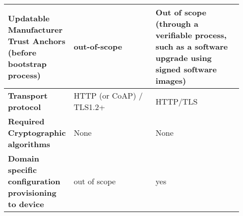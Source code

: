 \begin{longtable}{|m{0.171\linewidth}|m{0.372\linewidth}|m{0.393\linewidth}|}
		\hline
		\rowcolor[rgb]{ .745,  .804,  .843} \textbf{Updatable Manufacturer Trust Anchors (before bootstrap process)} & \cellcolor[rgb]{ 1,  1,  1}out-of-scope & \multicolumn{1}{p{18.335em}|}{\cellcolor[rgb]{ 1,  1,  1}
			Out of scope (through a verifiable process, such as a software upgrade using signed software images)
		} \bigstrut\\

		\hline
		\rowcolor[rgb]{ .745,  .804,  .843} \textbf{Transport protocol} & \cellcolor[rgb]{ 1,  1,  1}HTTP (or CoAP) / TLS1.2+ & \cellcolor[rgb]{ 1,  1,  1}HTTP/TLS \bigstrut\\

		\hline
		\rowcolor[rgb]{ .745,  .804,  .843} \textbf{Required Cryptographic algorithms } & \multicolumn{1}{p{18.335em}|}{\cellcolor[rgb]{ 1,  1,  1}None} & \multicolumn{1}{p{18.335em}|}{\cellcolor[rgb]{ 1,  1,  1}None} \bigstrut\\

		\hline
		\rowcolor[rgb]{ .745,  .804,  .843} \textbf{Domain specific configuration provisioning to device} & \cellcolor[rgb]{ 1,  1,  1}out of scope & \cellcolor[rgb]{ 1,  1,  1}yes \bigstrut\\

		\hline

\end{longtable}
%
%
